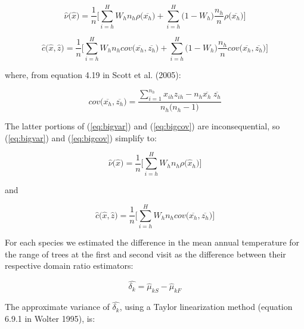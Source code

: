 \documentclass[12pt]{article}
\begin{document}
 \begin{equation} \label{eq:bigvar}
\hat{\nu}\big( \hat{x} \big) = \frac{1}{n} \Big[ \displaystyle\sum_{i=h}^{H} W_h n_h\rho\big(\overline{x_{h}}\big) +  
\displaystyle\sum_{i=h}^{H} \big(1 - W_h) \frac{ n_h}{n}\rho\big(\overline{x_h}\big)    \Big]
\end{equation}

 \begin{equation} \label{eq:bigcov}
\hat{c}\big(\hat{x}, \hat{z}\big) = \frac{1}{n} \Big[ \displaystyle\sum_{i=h}^{H} W_h n_h cov\big(\overline{x_h}, \overline{z_h}\big) +  
\displaystyle\sum_{i=h}^{H} \big(1 - W_h) \frac{ n_h}{n}cov\big(\overline{x_h}, \overline{z_h}\big)    \Big]
\end{equation}

where, from equation 4.19 in Scott et al. (2005):

\begin{equation}
cov\big(\overline{x_h}, \overline{z_h}\big) = \frac{\displaystyle\sum_{i=1}^{n_h}x_{ih}z_{ih}-n_h\overline{x_h} ~ \overline{z_{h}}}{n_h\big(n_h-1\big)}
\end{equation}

The latter portions of (\ref{eq:bigvar}) and (\ref{eq:bigcov}) are inconsequential, so (\ref{eq:bigvar}) and (\ref{eq:bigcov}) simplify to: 

 \begin{equation} \label{eq:bigvar_trunc}
\hat{\nu}\big( \hat{x} \big) = \frac{1}{n} \Big[ \displaystyle\sum_{i=h}^{H} W_h n_h\rho\big(\hat{x}_{h}\big)   \Big]
\end{equation}

and

 \begin{equation} \label{eq:bigcov_trunc}
\hat{c}\big(\hat{x}, \hat{z}\big) = \frac{1}{n} \Big[ \displaystyle\sum_{i=h}^{H} W_h n_h cov\big(\overline{x_h}, \overline{z_h}\big)    \Big] 
\end{equation}

For each species we estimated the difference in the mean annual temperature for the range of trees at the first and second visit as the difference between their respective domain ratio estimators:

 \begin{equation} \label{eq:delta}
\hat{\delta_k} = \hat\mu_{kS} - \hat\mu_{kF}
\end{equation}

The approximate variance of $\hat{\delta_k}$, using a Taylor linearization method (equation 6.9.1 in Wolter 1995), is: 
\end{document}
